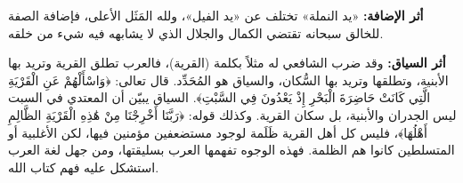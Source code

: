 \textbf{أثر الإضافة:} 
«يد النملة» تختلف عن «يد الفيل»، ولله المَثَل الأعلى، فإضافة الصفة للخالق سبحانه تقتضي الكمال والجلال الذي لا يشابهه فيه شيء من خلقه.

\textbf{أثر السياق:} 
وقد ضرب الشافعي له مثلاً بكلمة (القرية)، فالعرب تطلق القرية وتريد بها الأبنية، وتطلقها وتريد بها السُّكان، والسياق هو المُحَدِّد. قال تعالى: ﴿وَاسْأَلْهُمْ عَنِ الْقَرْيَةِ الَّتِي كَانَتْ حَاضِرَةَ الْبَحْرِ إِذْ يَعْدُونَ فِي السَّبْتِ﴾. السياق يبيّن أن المعتدي في السبت ليس الجدران والأبنية، بل سكان القرية. وكذلك قوله: ﴿رَبَّنَا أَخْرِجْنَا مِنْ هَٰذِهِ الْقَرْيَةِ الظَّالِمِ أَهْلُهَا﴾، فليس كل أهل القرية ظَلَمة لوجود مستضعفين مؤمنين فيها، لكن الأغلبية أو المتسلطين كانوا هم الظلمة. فهذه الوجوه تفهمها العرب بسليقتها، ومن جهل لغة العرب استشكل عليه فهم كتاب الله.